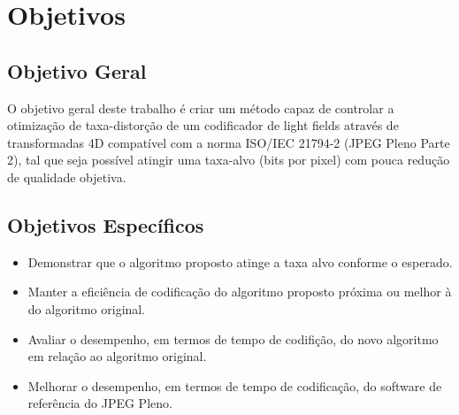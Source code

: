 \section{Objetivos}
    \subsection{Objetivo Geral}
        O objetivo geral deste trabalho é criar um método capaz de controlar a otimização de taxa-distorção de um codificador de light fields através 
        de transformadas 4D compatível com a norma ISO/IEC 21794-2 (JPEG Pleno Parte 2), tal que seja possível atingir uma taxa-alvo (bits por pixel) 
        com pouca redução de qualidade objetiva.

    \subsection{Objetivos Específicos}
        \begin{itemize}
            \item Demonstrar que o algoritmo proposto atinge a taxa alvo conforme o esperado.
            \item Manter a eficiência de codificação do algoritmo proposto próxima ou melhor à do algoritmo original.
            \item Avaliar o desempenho, em termos de tempo de codifição, do novo algoritmo em relação ao algoritmo original.
            \item Melhorar o desempenho, em termos de tempo de codificação, do software de referência do JPEG Pleno.
        \end{itemize}
